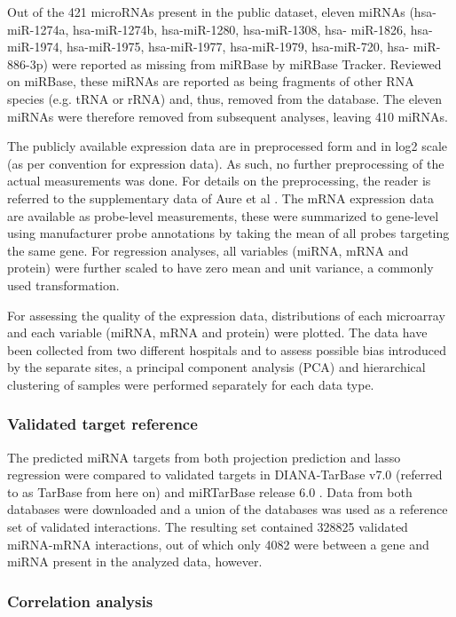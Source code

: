 Out of the 421 microRNAs present in the public dataset, eleven miRNAs (hsa-
miR-1274a, hsa-miR-1274b, hsa-miR-1280, hsa-miR-1308, hsa- miR-1826, hsa-
miR-1974, hsa-miR-1975, hsa-miR-1977, hsa-miR-1979, hsa-miR-720, hsa-
miR-886-3p) were reported as missing from miRBase by miRBase Tracker. Reviewed
on miRBase, these miRNAs are reported as being fragments of other RNA species
(e.g. tRNA or rRNA) and, thus, removed from the database. The eleven miRNAs
were therefore removed from subsequent analyses, leaving 410 miRNAs.

The publicly available expression data are in preprocessed form and 
in log2 scale (as per convention for expression data). As such,
no further preprocessing of the actual measurements was done. For details on
the preprocessing, the reader is referred to the supplementary data of Aure et
al \citep{Aure2015}. The mRNA expression data are available as probe-level
measurements, these were summarized to gene-level using manufacturer probe
annotations by taking the mean of all probes targeting the same gene.
For regression analyses, all variables (miRNA, mRNA
and protein) were further scaled to have zero mean and unit variance,
a commonly used transformation.

For assessing the quality of the expression data, distributions of each
microarray and each variable (miRNA, mRNA and protein) were plotted. The data
have been collected from two different hospitals and to assess possible bias
introduced by the separate sites, a principal component analysis (PCA) and
hierarchical clustering of samples were performed separately for each data
type.



\subsubsection{Validated target reference}

The predicted miRNA targets from both projection prediction and lasso
regression were compared to validated targets in DIANA-TarBase v7.0
\citep{Vlachos2015} (referred to as TarBase from here on) and miRTarBase
release 6.0 \citep{Chou2016}. Data from both databases were downloaded and a
union of the databases was used as a reference set of validated interactions.
The resulting set contained 328825 validated miRNA-mRNA interactions, out of
which only 4082 were between a gene and miRNA present in the analyzed data,
however.




\subsubsection{Correlation analysis}

